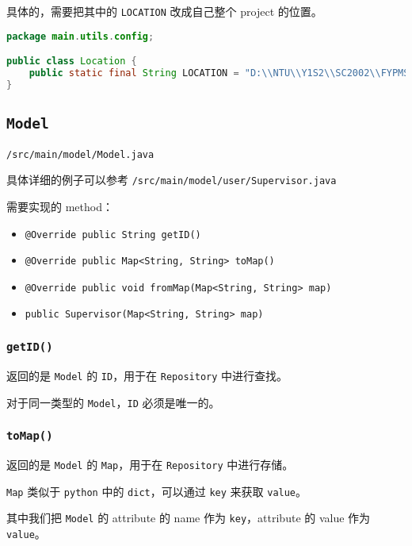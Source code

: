 \documentclass[hyperref,UTF8,12pt,a4paper]{ctexart}
\begin{document}
具体的，需要把其中的 \texttt{LOCATION} 改成自己整个 project 的位置。

\begin{lstlisting}[language=Java]
package main.utils.config;

public class Location {
    public static final String LOCATION = "D:\\NTU\\Y1S2\\SC2002\\FYPMS";
}
\end{lstlisting}

\subsection{\texttt{Model}}

\texttt{/src/main/model/Model.java}

具体详细的例子可以参考 \texttt{/src/main/model/user/Supervisor.java}

需要实现的 method：

\begin{itemize}
	\item \texttt{@Override public String getID()}
	\item \texttt{@Override public Map<String, String> toMap()}
	\item \texttt{@Override public void fromMap(Map<String, String> map)}
	\item \texttt{public Supervisor(Map<String, String> map)}
\end{itemize}

\subsubsection{\texttt{getID()}}

返回的是 \texttt{Model} 的 \texttt{ID}，用于在 \texttt{Repository} 中进行查找。

对于同一类型的 \texttt{Model}，\texttt{ID} 必须是唯一的。

\subsubsection{\texttt{toMap()}}

返回的是 \texttt{Model} 的 \texttt{Map}，用于在 \texttt{Repository} 中进行存储。

\texttt{Map} 类似于 \texttt{python} 中的 \texttt{dict}，可以通过 \texttt{key} 来获取 \texttt{value}。

其中我们把 \texttt{Model} 的 attribute 的 name 作为 \texttt{key}，attribute 的 value 作为 \texttt{value}。
\end{document}
